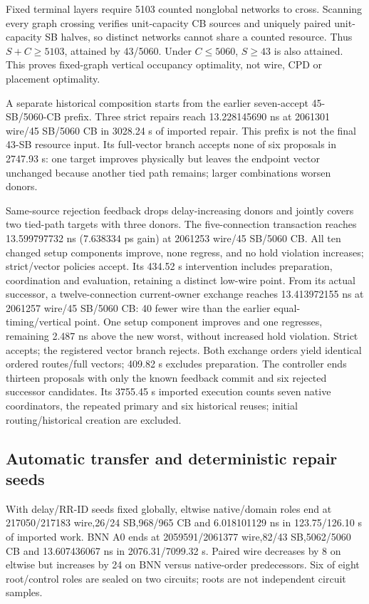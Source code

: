 \documentclass[conference,10pt]{IEEEtran}
\begin{document}
Fixed terminal layers require 5103 counted nonglobal networks to cross. Scanning every graph crossing verifies unit-capacity CB sources and uniquely paired unit-capacity SB halves, so distinct networks cannot share a counted resource. Thus $S+C\ge5103$, attained by 43/5060. Under $C\le5060$, $S\ge43$ is also attained. This proves fixed-graph vertical occupancy optimality, not wire, CPD or placement optimality.

A separate historical composition starts from the earlier seven-accept 45-SB/5060-CB prefix. Three strict repairs reach 13.228145690 ns at 2061301 wire/45 SB/5060 CB in 3028.24 s of imported repair. This prefix is not the final 43-SB resource input. Its full-vector branch accepts none of six proposals in 2747.93 s: one target improves physically but leaves the endpoint vector unchanged because another tied path remains; larger combinations worsen donors.

Same-source rejection feedback drops delay-increasing donors and jointly covers two tied-path targets with three donors. The five-connection transaction reaches 13.599797732 ns (7.638334 ps gain) at 2061253 wire/45 SB/5060 CB. All ten changed setup components improve, none regress, and no hold violation increases; strict/vector policies accept. Its 434.52 s intervention includes preparation, coordination and evaluation, retaining a distinct low-wire point. From its actual successor, a twelve-connection current-owner exchange reaches 13.413972155 ns at 2061257 wire/45 SB/5060 CB: 40 fewer wire than the earlier equal-timing/vertical point. One setup component improves and one regresses, remaining 2.487 ns above the new worst, without increased hold violation. Strict accepts; the registered vector branch rejects. Both exchange orders yield identical ordered routes/full vectors; 409.82 s excludes preparation. The controller ends thirteen proposals with only the known feedback commit and six rejected successor candidates. Its 3755.45 s imported execution counts seven native coordinators, the repeated primary and six historical reuses; initial routing/historical creation are excluded.

\subsection{Automatic transfer and deterministic repair seeds}
With delay/RR-ID seeds fixed globally, eltwise native/domain roles end at 217050/217183 wire,26/24 SB,968/965 CB and 6.018101129 ns in 123.75/126.10 s of imported work. BNN A0 ends at 2059591/2061377 wire,82/43 SB,5062/5060 CB and 13.607436067 ns in 2076.31/7099.32 s. Paired wire decreases by 8 on eltwise but increases by 24 on BNN versus native-order predecessors. Six of eight root/control roles are sealed on two circuits; roots are not independent circuit samples.
\end{document}
